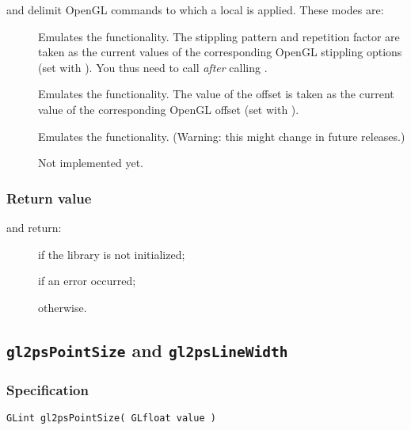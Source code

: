  and  delimit OpenGL commands to which a local
 is applied. These modes are:

\begin{description}
\item[] Emulates the 
  functionality. The stippling pattern and repetition factor are taken
  as the current values of the corresponding OpenGL stippling options
  (set with ). You thus need to call
   \emph{after} calling
  .
\item[] Emulates the
   functionality. The value of the offset is
  taken as the current value of the corresponding OpenGL offset (set with
  ).
\item[] Emulates the  functionality.
  (Warning: this might change in future releases.)
\item[] Not implemented yet.
\end{description}

\subsubsection{Return value}

\noindent{} and  return:
\begin{description}
\item[] if the library is not initialized;
\item[] if an error occurred;
\item[] otherwise.
\end{description}


\subsection{\texttt{gl2psPointSize} and \texttt{gl2psLineWidth}}
\label{sec:gl2psPointSize}

\subsubsection{Specification}

\begin{verbatim}
GLint gl2psPointSize( GLfloat value )
\end{verbatim}

